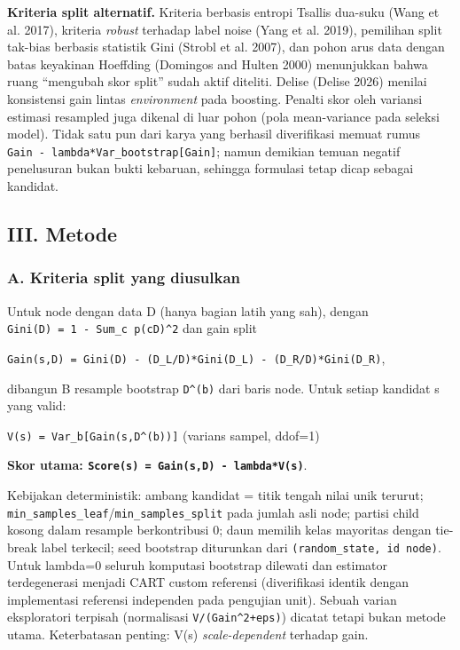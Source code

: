 \documentclass[
  conference]{IEEEtran}
\begin{document}
\textbf{Kriteria split alternatif.} Kriteria berbasis entropi Tsallis
dua-suku (Wang et al. 2017), kriteria \emph{robust} terhadap label noise
(Yang et al. 2019), pemilihan split tak-bias berbasis statistik Gini
(Strobl et al. 2007), dan pohon arus data dengan batas keyakinan
Hoeffding (Domingos and Hulten 2000) menunjukkan bahwa ruang ``mengubah
skor split'' sudah aktif diteliti. Delise (Delise 2026) menilai
konsistensi gain lintas \emph{environment} pada boosting. Penalti skor
oleh variansi estimasi resampled juga dikenal di luar pohon (pola
mean-variance pada seleksi model). Tidak satu pun dari karya yang
berhasil diverifikasi memuat rumus
\texttt{Gain\ -\ lambda*Var\_bootstrap{[}Gain{]}}; namun demikian temuan
negatif penelusuran bukan bukti kebaruan, sehingga formulasi tetap dicap
sebagai kandidat.

\subsection{III. Metode}\label{iii.-metode}

\subsubsection{A. Kriteria split yang
diusulkan}\label{a.-kriteria-split-yang-diusulkan}

Untuk node dengan data D (hanya bagian latih yang sah), dengan
\texttt{Gini(D)\ =\ 1\ -\ Sum\_c\ p(c\textbar{}D)\^{}2} dan gain split

\texttt{Gain(s,D)\ =\ Gini(D)\ -\ (\textbar{}D\_L\textbar{}/\textbar{}D\textbar{})*Gini(D\_L)\ -\ (\textbar{}D\_R\textbar{}/\textbar{}D\textbar{})*Gini(D\_R)},

dibangun B resample bootstrap \texttt{D\^{}(b)} dari baris node. Untuk
setiap kandidat s yang valid:

\texttt{V(s)\ =\ Var\_b{[}Gain(s,D\^{}(b)){]}} (varians sampel, ddof=1)

\textbf{Skor utama: \texttt{Score(s)\ =\ Gain(s,D)\ -\ lambda*V(s)}}.

Kebijakan deterministik: ambang kandidat = titik tengah nilai unik
terurut; \texttt{min\_samples\_leaf}/\texttt{min\_samples\_split} pada
jumlah asli node; partisi child kosong dalam resample berkontribusi 0;
daun memilih kelas mayoritas dengan tie-break label terkecil; seed
bootstrap diturunkan dari \texttt{(random\_state,\ id\ node)}. Untuk
lambda=0 seluruh komputasi bootstrap dilewati dan estimator
terdegenerasi menjadi CART custom referensi (diverifikasi identik dengan
implementasi referensi independen pada pengujian unit). Sebuah varian
eksploratori terpisah (normalisasi \texttt{V/(Gain\^{}2+eps)}) dicatat
tetapi bukan metode utama. Keterbatasan penting: V(s)
\emph{scale-dependent} terhadap gain.
\end{document}
